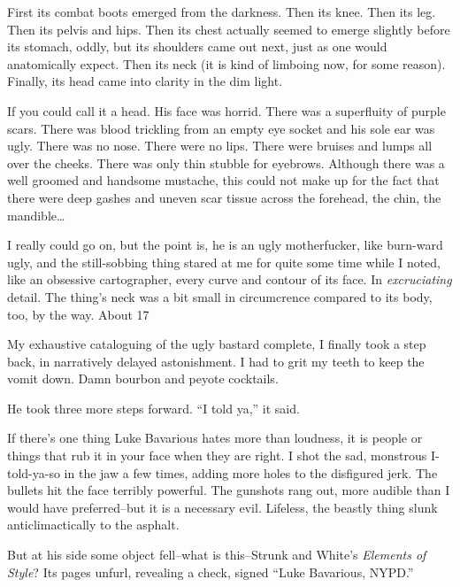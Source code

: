 First its combat boots emerged from the darkness. Then its knee.
Then its leg. Then its pelvis and hips. Then its chest actually
seemed to emerge slightly before its stomach, oddly, but its
shoulders came out next, just as one would anatomically expect.
Then its neck (it is kind of limboing now, for some reason).
Finally, its head came into clarity in the dim light.



If you could call it a head. His face was horrid. There was a
superfluity of purple scars. There was blood trickling from an
empty eye socket and his sole ear was ugly. There was no nose.
There were no lips. There were bruises and lumps all over the
cheeks. There was only thin stubble for eyebrows. Although there
was a well groomed and handsome mustache, this could not make up
for the fact that there were deep gashes and uneven scar tissue
across the forehead, the chin, the mandible{\ldots}



I really could go on, but the point is, he is an ugly motherfucker,
like burn-ward ugly, and the still-sobbing thing stared at me for
quite some time while I noted, like an obsessive cartographer,
every curve and contour of its face. In {\em excruciating} detail.
The thing's neck was a bit small in circumcrence compared to
its body, too, by the way. About 17%



My exhaustive cataloguing of the ugly bastard complete, I finally
took a step back, in narratively delayed astonishment. I had to
grit my teeth to keep the vomit down. Damn bourbon and peyote
cocktails.



He took three more steps forward. ``I told ya,'' it
said.



If there's one thing Luke Bavarious hates more than loudness,
it is people or things that rub it in your face when they are
right. I shot the sad, monstrous I-told-ya-so in the jaw a few
times, adding more holes to the disfigured jerk. The bullets hit
the face terribly powerful. The gunshots rang out, more audible
than I would have preferred--but it is a necessary evil. Lifeless,
the beastly thing slunk anticlimactically to the asphalt.



But at his side some object fell--what is this--Strunk and
White's {\em Elements of Style}? Its pages unfurl, revealing
a check, signed ``Luke Bavarious, NYPD.''



